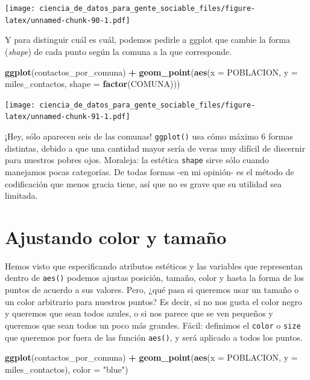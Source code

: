 \documentclass[spanish,]{book}
\newenvironment{Shaded}{\begin{snugshade}}{\end{snugshade}}
\newcommand{\DataTypeTok}[1]{\textcolor[rgb]{0.13,0.29,0.53}{#1}}
\newcommand{\KeywordTok}[1]{\textcolor[rgb]{0.13,0.29,0.53}{\textbf{#1}}}
\newcommand{\NormalTok}[1]{#1}
\newcommand{\OperatorTok}[1]{\textcolor[rgb]{0.81,0.36,0.00}{\textbf{#1}}}
\newcommand{\StringTok}[1]{\textcolor[rgb]{0.31,0.60,0.02}{#1}}
\begin{document}
\texttt{[image: ciencia\_de\_datos\_para\_gente\_sociable\_files/figure-latex/unnamed-chunk-90-1.pdf]}

Y para distinguir cuál es cuál, podemos pedirle a ggplot que cambie la forma (\emph{shape}) de cada punto según la comuna a la que corresponde.

\begin{Shaded}
\begin{Highlighting}[]
\KeywordTok{ggplot}\NormalTok{(contactos_por_comuna) }\OperatorTok{+}\StringTok{ }
\StringTok{    }\KeywordTok{geom_point}\NormalTok{(}\KeywordTok{aes}\NormalTok{(}\DataTypeTok{x =}\NormalTok{ POBLACION, }\DataTypeTok{y =}\NormalTok{ miles_contactos, }\DataTypeTok{shape =} \KeywordTok{factor}\NormalTok{(COMUNA)))}
\end{Highlighting}
\end{Shaded}

\texttt{[image: ciencia\_de\_datos\_para\_gente\_sociable\_files/figure-latex/unnamed-chunk-91-1.pdf]}

¡Hey, sólo aparecen seis de las comunas! \texttt{ggplot()} usa cómo máximo 6 formas distintas, debido a que una cantidad mayor sería de veras muy difícil de discernir para nuestros pobres ojos. Moraleja: la estética \texttt{shape} sirve sólo cuando manejamos pocas categorías. De todas formas -en mi opinión- es el método de codificación que menos gracia tiene, así que no es grave que su utilidad sea limitada.

\hypertarget{ajustando-color-y-tamauxf1o}{%
\section{Ajustando color y tamaño}\label{ajustando-color-y-tamauxf1o}}

Hemos visto que especificando atributos estéticos y las variables que representan dentro
de \texttt{aes()} podemos ajustas posición, tamaño, color y hasta la forma de los puntos de acuerdo a sus valores. Pero, ¿qué pasa si queremos usar un tamaño o un color arbitrario para nuestros puntos? Es decir, si no nos gusta el color negro y queremos que sean todos azules, o si nos parece que se ven pequeños y queremos que sean todos un poco más grandes. Fácil: definimos el \texttt{color} o \texttt{size} que queremos por fuera de las función \texttt{aes()}, y será aplicado a todos los puntos.

\begin{Shaded}
\begin{Highlighting}[]
\KeywordTok{ggplot}\NormalTok{(contactos_por_comuna) }\OperatorTok{+}\StringTok{ }
\StringTok{    }\KeywordTok{geom_point}\NormalTok{(}\KeywordTok{aes}\NormalTok{(}\DataTypeTok{x =}\NormalTok{ POBLACION, }\DataTypeTok{y =}\NormalTok{ miles_contactos), }\DataTypeTok{color =} \StringTok{"blue"}\NormalTok{)}
\end{Highlighting}
\end{Shaded}
\end{document}
